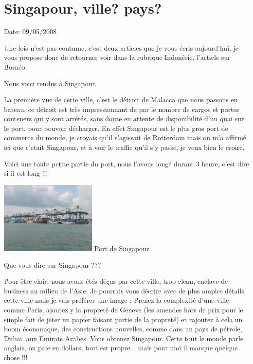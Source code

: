 \section{Singapour, ville? pays?}

Date: 09/05/2008

\begin{multicols}{2}

Une fois n'est pas coutume, c'est deux articles que je vous écris aujourd'hui, je vous propose donc de retourner voir dans la rubrique Indonésie, l'article sur Bornéo.

Nous voici rendus à Singapour.

La première vue de cette ville, c'est le détroit de Malacca que nous passons en bateau, ce détroit est très impressionnant de par le nombre de cargos et portes conteners qui y sont arrétés, sans doute en attente de disponibilité d'un quai sur le port, pour pouvoir décharger. En effet Singapour est le plus gros port de commerce du monde, je croyais qu'il s'agissait de Rotterdam mais on m'a affirmé ici que c'etait Singapour, et à voir le traffic qu'il s'y passe, je veux bien le croire.


Voici une toute petite partie du port, nous l'avons longé durant 3 heure, c'est dire si il est long !!!

\hspace*{-0.65cm}
\includegraphics[width=4.8cm]{articles/Singapour-ville-pays/1210333644359c.jpg}
Port de Singapour.

Que vous dire sur Singapour ???

Pour être clair, nous avons étés déçus par cette ville, trop clean, enclave de business au milieu de l'Asie. Je pourrais vous décrire avec de plus amples détails cette ville mais je vais préférer une image : Prenez la complexité d'une ville comme Paris, ajoutez y la propreté de Geneve (les amendes hors de prix pour le simple fait de jeter un papier faisant partie de la propreté) et rajoutez à cela un boom économique, des constructions nouvelles, comme dans un pays de pétrole, Dubaï, aux Emirats Arabes. Vous obtenez Singapour. Certe tout le monde parle anglais, on paie en dollars, tout est propre... mais pour moi il manque quelque chose !!!


\end{multicols}
